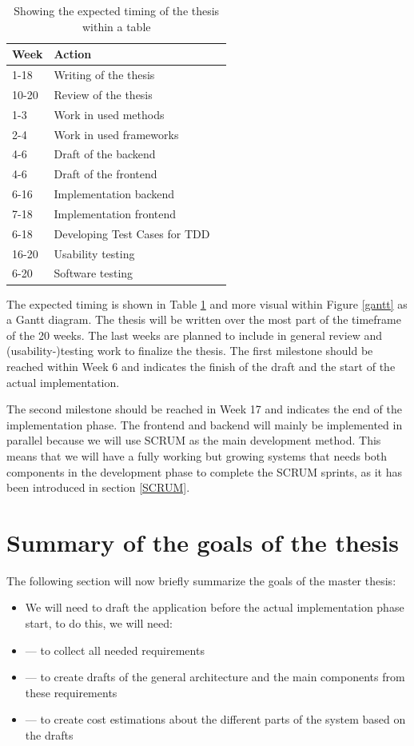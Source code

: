 \documentclass[a4page]{article}
\begin{document}
\begin{table}[h]
\centering%
\begin{tabular}{lll}
Week  		& 	Action				&  \\
\hline 
 1-18		&Writing of the thesis		&  \\
 10-20		& Review of the thesis		&  \\
 1-3			& Work in used methods		&  \\
  2-4 			& Work in used frameworks	&  \\ 				 	
  4-6			& Draft of the backend		&  \\ 
  4-6			& Draft of the frontend		& \\
  6-16		& Implementation backend	&  \\ 
  7-18		& Implementation frontend	&  \\ 
  6-18		& Developing Test Cases for TDD	&  \\ 
 16-20		& Usability testing				&  \\ 
 6-20		& Software testing				&  \\ 
\hline
\end{tabular}
\caption{Showing the expected timing of the thesis within a table}
\label{tgantt}
\end{table}

The expected timing is shown in Table \ref{tgantt} and more visual within Figure \ref{gantt} as a Gantt diagram. The thesis will be written over the most part of the timeframe of the 20 weeks. The last weeks are planned to include in general review and (usability-)testing work to finalize the thesis. The first milestone should be reached within Week 6 and indicates the finish of the draft and the start of the actual implementation. 

The second milestone should be reached in Week 17 and indicates the end of the implementation phase. The frontend and backend will mainly be implemented in parallel because we will use SCRUM as the main development method. This means that we will have a fully working but growing systems that needs both components in the development phase to complete the SCRUM sprints, as it has been introduced in section \ref{SCRUM}. 

\section{Summary of the goals of the thesis}
The following section will now briefly summarize the goals of the master thesis:
\begin{itemize}
	\item We will need to draft the application before the actual implementation phase start, to do this, we will need:
	\item --- to collect all needed requirements
	\item --- to create drafts of the general architecture and the main components from these requirements
	\item --- to create cost estimations about the different parts of the system based on the drafts
\end{itemize} 
\end{document}
